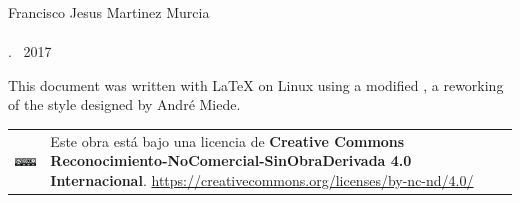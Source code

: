
\thispagestyle{empty}

\hfill


\begin{center}
	Francisco Jesus Martinez Murcia\\
	\smallskip
	\textit{\myTitle}\\
	\smallskip
	\mySubtitle. \textcopyright\textcopyright\ 2017
\end{center}

\medskip


\noindent
This document was written with \LaTeX{} on Linux using a modified \arsclassica, a reworking of the \classicthesis{} style designed by Andr\'e Miede.
\bigskip

\noindent
\textsf{}

\noindent
\begin{tabularx}{\linewidth}{@{}lX@{}}
	\multirow{3}{1in}{\includegraphics[width=1in]{Graphics/Cc-by-nc-nd_icon}} & {\small Este obra está bajo una licencia de \textbf{Creative Commons Reconocimiento-NoComercial-SinObraDerivada 4.0 Internacional}.	\url{https://creativecommons.org/licenses/by-nc-nd/4.0/}}\\
\end{tabularx}

\bigskip

\noindent
\textsf{}

\noindent
{}\,
